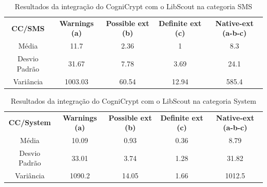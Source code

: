 \begin{table}[!htbp]
  \centering
  \small
  \begin{tabular}{|c|c|c|c|c|}
  
\textbf{CC/SMS}   & \textbf{Warnings (a)}   &  \textbf{Possible ext (b)}     &  \textbf{Definite ext (c)} &  \textbf{Native-ext (a-b-c)} \\ 
Média                      & \num{11.7}              &  \num{2.36}                                         & \num{1}                                        & \num{8.3}                                                    \\
Desvio Padrão              & \num{31.67}              &  \num{7.78}                                         & \num{3.69}                                        & \num{24.1}   \\                                                 
Variância                  & \num{1003.03}            &  \num{60.54}                                         & \num{12.94}                                       & \num{585.4}             \\                                       
\end{tabular}
    
  \caption{Resultados da integração do CogniCrypt com o LibScout na categoria SMS}
\label{table: AplicativosComWarningCCSMS}
\end{table}


\begin{table}[!htbp]
  \centering
  \small
  \begin{tabular}{|c|c|c|c|c|}
  
\textbf{CC/System}   & \textbf{Warnings (a)}   &  \textbf{Possible ext (b)}     &  \textbf{Definite ext (c)} &  \textbf{Native-ext (a-b-c)} \\ 
Média                      & \num{10.09}              &  \num{0.93}                                         & \num{0.36}                                        & \num{8.79}                                                    \\
Desvio Padrão              & \num{33.01}              &  \num{3.74}                                         & \num{1.28}                                        & \num{31.82}  \\                                                  
Variância                  & \num{1090.2}            &  \num{14.05}                                         & \num{1.66}                                       & \num{1012.5}  \\                                                  
\end{tabular}
    
  \caption{Resultados da integração do CogniCrypt com o LibScout na categoria System}
\label{table: AplicativosComWarningCCS}
\end{table}

